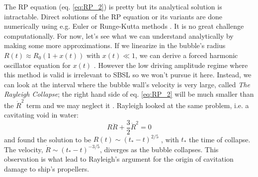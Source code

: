 \documentclass[11pt,prb,aps,nofootinbib,superscriptaddress,floatfix]{revtex4-2}
\begin{document}
The RP equation (eq. \ref{eq:RP_2}) is pretty but its analytical solution is intractable. Direct solutions of the RP equation or its variants are done numerically using e.g. Euler or Runge-Kutta methods \cite{yasui2018acoustic,yasui2015dynamics}. It is no great challenge computationally. For now, let's see what we can understand analytically by making some more approximations. If we linearize in the bubble's radius $R(t)\approx R_0 \left( 1+x(t) \right)$ with $x(t) \ll 1$, we can derive a forced harmonic oscillator equation for $x(t)$ \cite{brennen2014cavitation,yasui2018acoustic}. However the low driving amplitude regime where this method is valid is irrelevant to SBSL so we won't pursue it here. Instead, we can look at the interval where the bubble wall's velocity is very large, called \emph{The Rayleigh Collapse}; the right hand side of eq. \ref{eq:RP_2} will be much smaller than the $\dot{R}^2$ term and we may neglect it \cite{rayleigh1917pressure,plesset1949dynamics,prosperetti1999old,brenner2002single}. Rayleigh looked at the same problem, i.e. a cavitating void in water:
\begin{equation}
    R\ddot{R}+\frac{3}{2}\dot{R}^2=0
    \label{eq:Rayleigh}
\end{equation}
and found the solution to be $R(t)\sim\left(t_*-t\right)^{2/5}$ \cite{brenner2002single}, with $t_*$ the time of collapse. The velocity, $\dot{R}\sim\left(t_*-t \right)^{-3/5}$, diverges as the bubble collapses. This observation is what lead to Rayleigh's argument for the origin of cavitation damage to ship's propellers. %
\end{document}
